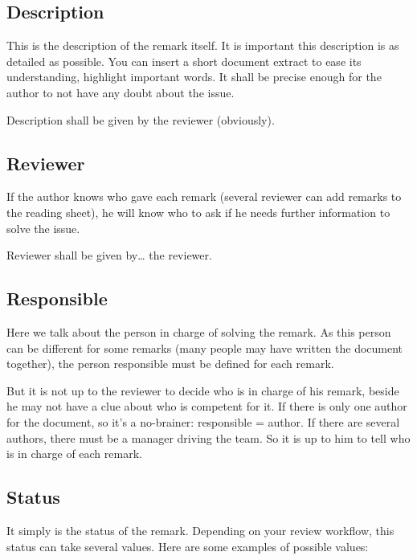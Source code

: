 \subsection{Description}
This is the description of the remark itself. It is important this description is as detailed as possible. You can insert a short document extract to ease its understanding, highlight important words. It shall be precise enough for the author to not have any doubt about the issue.

Description shall be given by the reviewer (obviously).

\subsection{Reviewer}
If the author knows who gave each remark (several reviewer can add remarks to the reading sheet), he will know who to ask if he needs further information to solve the issue.

Reviewer shall be given by… the reviewer.

\subsection{Responsible}
Here we talk about the person in charge of solving the remark. As this person can be different for some remarks (many people may have written the document together), the person responsible must be defined for each remark.

But it is not up to the reviewer to decide who is in charge of his remark, beside he may not have a clue about who is competent for it.
If there is only one author for the document, so it’s a no-brainer: responsible = author.
If there are several authors, there must be a manager driving the team. So it is up to him to tell who is in charge of each remark.

\subsection{Status}
It simply is the status of the remark. Depending on your review workflow, this status can take several values. Here are some examples of possible values:

